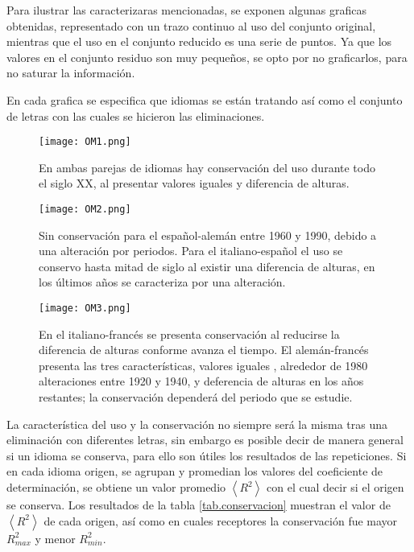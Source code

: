 Para ilustrar las caracterizaras mencionadas, se exponen algunas graficas obtenidas, representado con un trazo continuo al uso del conjunto original, mientras que el uso en el conjunto reducido  es una serie de puntos.   Ya que los valores en el conjunto residuo son muy pequeños, se opto por no graficarlos, para no saturar la información. 

En cada grafica se especifica que idiomas se están tratando así como el conjunto de letras con las cuales se hicieron las eliminaciones. 

\clearpage

\begin{figure}[h!]
	\centering
	\texttt{[image: OM1.png]}
	\label{fig.OM1}
	\caption{En ambas parejas de idiomas hay conservación del uso durante todo el siglo XX, al presentar valores iguales y  diferencia de alturas.}
\end{figure}


\begin{figure}[h!]
	\centering
	\texttt{[image: OM2.png]}
	\label{fig.OM2}
	\caption{Sin conservación para el español-alemán entre 1960 y 1990,  debido a una alteración por periodos. Para el italiano-español el uso se conservo hasta mitad de siglo al existir una diferencia de alturas, en los últimos años se caracteriza por una alteración.}
\end{figure}

\clearpage
\begin{figure}[h!]
	\centering
	\texttt{[image: OM3.png]}
	\label{fig.OM3}
	\caption{ En el italiano-francés se presenta conservación al  reducirse la diferencia de alturas conforme avanza el tiempo. El alemán-francés  presenta las tres características,  valores iguales  , alrededor de 1980  alteraciones entre 1920 y 1940, y deferencia de alturas  en los años restantes; la conservación dependerá del periodo  que se estudie.}
\end{figure}




La característica del uso y la conservación no siempre será la misma tras una eliminación con diferentes letras, sin embargo es posible decir de manera general si un idioma se conserva, para ello son útiles los resultados de las repeticiones. Si en cada idioma origen, se agrupan y promedian los valores del coeficiente de determinación,  se obtiene un valor promedio $\left \langle R^{2}  \right \rangle$ con el cual decir si el origen se conserva.  Los resultados de la tabla \ref{tab.conservacion} muestran el valor de  $\left \langle R^{2} \right \rangle$ de cada origen,  así como en cuales receptores la conservación fue mayor $R^{2}_{max}$ y  menor $R^{2}_{min}$.





